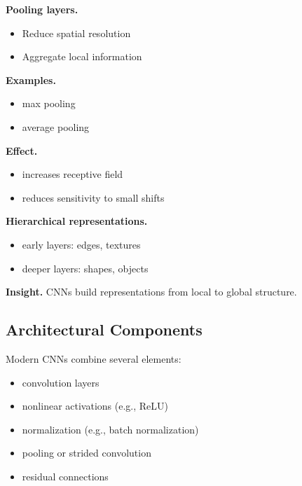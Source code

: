 \textbf{Pooling layers.}

\begin{itemize}
    \item Reduce spatial resolution
    \item Aggregate local information
\end{itemize}

\medskip

\noindent
\textbf{Examples.}

\begin{itemize}
    \item max pooling
    \item average pooling
\end{itemize}

\medskip

\noindent
\textbf{Effect.}

\begin{itemize}
    \item increases receptive field
    \item reduces sensitivity to small shifts
\end{itemize}

\medskip

\noindent
\textbf{Hierarchical representations.}

\begin{itemize}
    \item early layers: edges, textures
    \item deeper layers: shapes, objects
\end{itemize}

\medskip

\noindent
\textbf{Insight.}  
CNNs build representations from local to global structure.

\subsection{Architectural Components}

Modern CNNs combine several elements:

\begin{itemize}
    \item convolution layers
    \item nonlinear activations (e.g., ReLU)
    \item normalization (e.g., batch normalization)
    \item pooling or strided convolution
    \item residual connections
\end{itemize}

